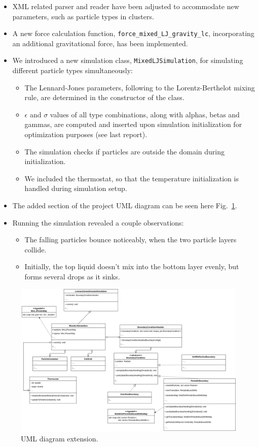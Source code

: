 \documentclass{article}
\begin{document}
    \begin{itemize}
        \item XML related parser and reader have been adjusted to accommodate new parameters, such as particle types in clusters.
        \item A new force calculation function, \texttt{force\_mixed\_LJ\_gravity\_lc}, incorporating an additional gravitational force, has been implemented.
        \item We introduced a new simulation class, \texttt{MixedLJSimulation}, for simulating different particle types simultaneously:
        \begin{itemize}
            \item The Lennard-Jones parameters, following to the Lorentz-Berthelot mixing rule, are determined in the constructor of the class.
            \item $\epsilon$ and $\sigma$ values of all type combinations, along with alphas, betas and gammas, are computed and inserted upon simulation initialization for optimization purposes (see last report).
            \item The simulation checks if particles are outside the domain during initialization.
            \item We included the thermostat, so that the temperature initialization is handled during simulation setup.
        \end{itemize}
        \item The added section of the project UML diagram can be seen here Fig.\ \ref{fig:uml}.
        \item Running the simulation revealed a couple observations:
        \begin{itemize}
            \item The falling particles bounce noticeably, when the two particle layers collide.
            \item Initially, the top liquid doesn't mix into the bottom layer evenly, but forms several drops as it sinks.
        \end{itemize}
    \end{itemize}

\begin{figure}[H]
    \includegraphics[width=1.25\textwidth]{../../res/UML4v2.drawio}
    \caption{UML diagram extension.}
    \label{fig:uml}
\end{figure}
\end{document}
